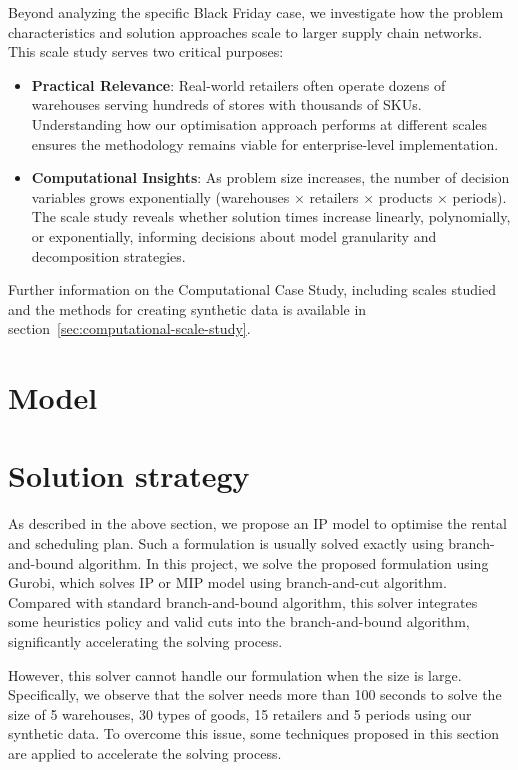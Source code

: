 \documentclass[a4paper,12pt]{article}
\begin{document}
Beyond analyzing the specific Black Friday case, we investigate how the problem characteristics and solution approaches scale to larger supply chain networks.
This scale study serves two critical purposes:
\begin{itemize}
    \item \textbf{Practical Relevance}: Real-world retailers often operate dozens of warehouses serving hundreds of stores with thousands of SKUs.
    Understanding how our optimisation approach performs at different scales ensures the methodology remains viable for enterprise-level implementation.

    \item \textbf{Computational Insights}: As problem size increases, the number of decision variables grows exponentially (warehouses × retailers × products × periods).
    The scale study reveals whether solution times increase linearly, polynomially, or exponentially, informing decisions about model granularity and decomposition strategies.
\end{itemize}


Further information on the Computational Case Study, including scales studied and the methods for creating synthetic data is available in section~\ref{sec:computational-scale-study}.





\section{Model}\label{sec:model}


\section{Solution strategy}\label{sec:solution-strategy}

As described in the above section, we propose an IP model to optimise the rental and scheduling plan.
Such a formulation is usually solved exactly using branch-and-bound algorithm.
In this project, we solve the proposed formulation using Gurobi, which solves IP or MIP model using branch-and-cut algorithm.
Compared with standard branch-and-bound algorithm, this solver integrates some heuristics policy and valid cuts into the branch-and-bound algorithm, significantly accelerating the solving process.

However, this solver cannot handle our formulation when the size is large.
Specifically, we observe that the solver needs more than 100 seconds to solve the size of 5 warehouses, 30 types of goods, 15 retailers and 5 periods using our synthetic data.
To overcome this issue, some techniques proposed in this section are applied to accelerate the solving process.
\end{document}
